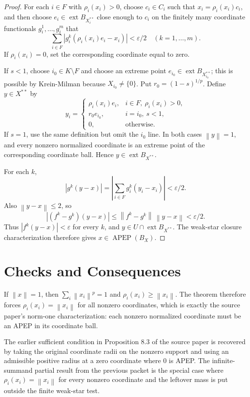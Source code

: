 \documentclass[11pt]{article}
\newcommand{\APEP}{\operatorname{APEP}}
\newcommand{\ext}{\operatorname{ext}}
\newcommand{\Ball}{B}
\newcommand{\norm}[1]{\left\lVert #1 \right\rVert}
\begin{document}
\begin{proof}
For each $i\in F$ with $\rho_i(x_i)>0$, choose
$c_i\in C_i$ such that $x_i=\rho_i(x_i)c_i$, and then choose
$e_i\in\ext\Ball_{X_i^{**}}$ close enough to $c_i$ on the finitely many
coordinate functionals $g_i^1,\ldots,g_i^m$ that
\[
 \sum_{i\in F}
 |g_i^k(\rho_i(x_i)e_i-x_i)|<\varepsilon/2
 \quad (k=1,\ldots,m).
\]
If $\rho_i(x_i)=0$, set the corresponding coordinate equal to zero.

If $s<1$, choose $i_0\in K\setminus F$ and choose an extreme point
$e_{i_0}\in\ext\Ball_{X_{i_0}^{**}}$; this is possible by Krein-Milman
because $X_{i_0}\neq\{0\}$. Put $r_0=(1-s)^{1/p}$. Define $y\in X^{**}$
by
\[
 y_i=
 \begin{cases}
   \rho_i(x_i)e_i, & i\in F,\ \rho_i(x_i)>0,\\
   r_0e_{i_0}, & i=i_0,\ s<1,\\
   0, & \text{otherwise.}
 \end{cases}
\]
If $s=1$, use the same definition but omit the $i_0$ line.
In both cases $\norm{y}=1$, and every nonzero normalized coordinate is an
extreme point of the corresponding coordinate ball. Hence
$y\in\ext\Ball_{X^{**}}$.

For each $k$,
\[
  |g^k(y-x)|
  =
  \left|\sum_{i\in F}g_i^k(y_i-x_i)\right|
  <\varepsilon/2.
\]
Also $\norm{y-x}\le2$, so
\[
  |(f^k-g^k)(y-x)|
  \le \norm{f^k-g^k}\,\norm{y-x}
  <\varepsilon/2.
\]
Thus $|f^k(y-x)|<\varepsilon$ for every $k$, and
$y\in U\cap\ext\Ball_{X^{**}}$. The weak-star closure characterization
therefore gives $x\in\APEP(\Ball_X)$.
\end{proof}

\section*{Checks and Consequences}

If $\norm{x}=1$, then $\sum_i\norm{x_i}^p=1$ and
$\rho_i(x_i)\ge\norm{x_i}$. The theorem therefore forces
$\rho_i(x_i)=\norm{x_i}$ for all nonzero coordinates, which is exactly
the source paper's norm-one characterization: each nonzero normalized
coordinate must be an APEP in its coordinate ball.

The earlier sufficient condition in Proposition 8.3 of the source paper
is recovered by taking the original coordinate radii on the nonzero
support and using an admissible positive radius at a zero coordinate
where $0$ is APEP. The infinite-summand partial result from the previous
packet is the special case where
$\rho_i(x_i)=\norm{x_i}$ for every nonzero coordinate and the leftover
mass is put outside the finite weak-star test.
\end{document}
